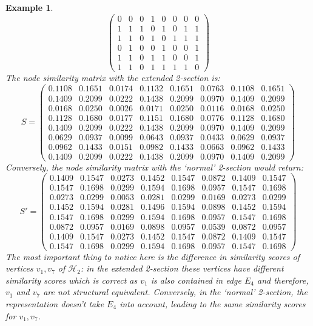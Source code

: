 \documentclass[a4paper,11pt]{report}
\newtheorem{example}[theorem]{Example}
\newcommand{\hgrafeen}{\mathcal{H}}
\begin{document}
\begin{example}
$$\begin{pmatrix}
 0& 0& 0& 1& 0& 0& 0& 0\\
 1& 1& 1& 0& 1& 0& 1& 1\\
 1& 1& 0& 1& 0& 1& 1& 1\\
 0& 1& 0& 0& 1& 0& 0& 1\\
 1& 1& 0& 1& 1& 0& 0& 1\\
1& 1& 0& 1& 1& 1& 1& 0
\end{pmatrix}$$
The node similarity matrix with the extended 2-section is:
$$S = \begin{pmatrix}
\mathbf{0.1108}&\mathbf{0.1651}&\mathbf{0.0174}&\mathbf{0.1132}&\mathbf{0.1651}&\mathbf{0.0763}&\mathbf{0.1108}&\mathbf{0.1651}\\
0.1409&0.2099&0.0222&0.1438&0.2099&0.0970&0.1409&0.2099\\
0.0168&0.0250&0.0026&0.0171&0.0250&0.0116&0.0168&0.0250\\
0.1128&0.1680&0.0177&0.1151&0.1680&0.0776&0.1128&0.1680\\
0.1409&0.2099&0.0222&0.1438&0.2099&0.0970&0.1409&0.2099\\
0.0629&0.0937&0.0099&0.0643&0.0937&0.0433&0.0629&0.0937\\
\mathbf{0.0962}&\mathbf{0.1433}&\mathbf{0.0151}&\mathbf{0.0982}&\mathbf{0.1433}&\mathbf{0.0663}&\mathbf{0.0962}&\mathbf{0.1433}\\
0.1409&0.2099&0.0222&0.1438&0.2099&0.0970&0.1409&0.2099
\end{pmatrix}$$
Conversely, the node similarity matrix with the `normal' 2-section would return:
$$S' = \begin{pmatrix}
\mathbf{0.1409}&\mathbf{0.1547}&\mathbf{0.0273}&\mathbf{0.1452}&\mathbf{0.1547}&\mathbf{0.0872}&\mathbf{0.1409}&\mathbf{0.1547}\\
0.1547&0.1698&0.0299&0.1594&0.1698&0.0957&0.1547&0.1698\\
0.0273&0.0299&0.0053&0.0281&0.0299&0.0169&0.0273&0.0299\\
0.1452&0.1594&0.0281&0.1496&0.1594&0.0898&0.1452&0.1594\\
0.1547&0.1698&0.0299&0.1594&0.1698&0.0957&0.1547&0.1698\\
0.0872&0.0957&0.0169&0.0898&0.0957&0.0539&0.0872&0.0957\\
\mathbf{0.1409}&\mathbf{0.1547}&\mathbf{0.0273}&\mathbf{0.1452}&\mathbf{0.1547}&\mathbf{0.0872}&\mathbf{0.1409}&\mathbf{0.1547}\\
0.1547&0.1698&0.0299&0.1594&0.1698&0.0957&0.1547&0.1698
\end{pmatrix}$$
The most important thing to notice here is the difference in similarity scores 
of vertices $v_1, v_7$ of $\hgrafeen_2$: in the extended 2-section these 
vertices have different similarity scores which is correct as $v_1$ is also contained in edge 
$E_4$ and therefore, $v_1$ and $v_7$ are not structural equivalent. Conversely, in the `normal'
2-section, the representation doesn't take $E_4$ into account, leading 
to the same similarity scores for $v_1, v_7$.
\end{example}
\end{document}
